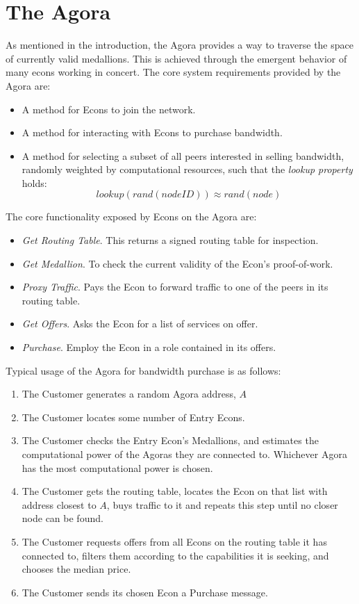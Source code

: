 \documentclass{article}
\begin{document}
\section{The Agora}
\label{agora}

As mentioned in the introduction, the Agora provides a way to traverse the space of currently valid medallions. This is achieved through the emergent behavior of many econs working in concert. The core system requirements provided by the Agora are:

\begin{itemize}
    \item A method for Econs to join the network.
    \item A method for interacting with Econs to purchase bandwidth.
    \item A method for selecting a subset of all peers interested in selling bandwidth, randomly weighted by computational resources, such that the \emph{lookup property} holds: $$lookup(rand(nodeID)) \approx rand(node)$$
\end{itemize}

The core functionality exposed by Econs on the Agora are:

\begin{itemize}
    \item \emph{Get Routing Table}. This returns a signed routing table for inspection.
    \item \emph{Get Medallion}. To check the current validity of the Econ's proof-of-work.
    \item \emph{Proxy Traffic}. Pays the Econ to forward traffic to one of the peers in its routing table.
    \item \emph{Get Offers}. Asks the Econ for a list of services on offer.
    \item \emph{Purchase}. Employ the Econ in a role contained in its offers.
\end{itemize}

Typical usage of the Agora for bandwidth purchase is as follows:

\begin{enumerate}
    \item The Customer generates a random Agora address, $A$
    \item The Customer locates some number of Entry Econs.
    \item The Customer checks the Entry Econ's Medallions, and estimates the computational power of the Agoras they are connected to. Whichever Agora has the most computational power is chosen.
    \item The Customer gets the routing table, locates the Econ on that list with address closest to $A$, buys traffic to it and repeats this step until no closer node can be found.
    \item The Customer requests offers from all Econs on the routing table it has connected to, filters them according to the capabilities it is seeking, and chooses the median price.
    \item The Customer sends its chosen Econ a Purchase message.
\end{enumerate}
\end{document}
